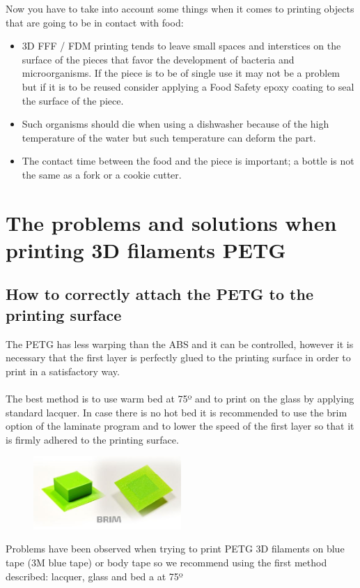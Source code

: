 \documentclass[11pt,a4paper]{article}
\begin{document}
Now you have to take into account some things when it comes to printing objects that are going to be in contact with food:
\begin{itemize}
	\item 3D FFF / FDM printing tends to leave small spaces and interstices on the surface of the pieces that favor the development of bacteria and microorganisms. If the piece is to be of single use it may not be a problem but if it is to be reused consider applying a Food Safety epoxy coating to seal the surface of the piece.
	\item Such organisms should die when using a dishwasher because of the high temperature of the water but such temperature can deform the part.
	\item The contact time between the food and the piece is important; a bottle is not the same as a fork or a cookie cutter.
\end{itemize}
\section{The problems and solutions when printing 3D filaments PETG}
	\subsection{How to correctly attach the PETG to the printing surface}The PETG has less warping than the ABS and it can be controlled, however it is necessary that the first layer is perfectly glued to the printing surface in order to print in a satisfactory way.
\\\\
The best method is to use warm bed at 75º and to print on the glass by applying standard lacquer. In case there is no hot bed it is recommended to use the brim option of the laminate program and to lower the speed of the first layer so that it is firmly adhered to the printing surface.
\begin{figure}[H]
\centering
\includegraphics[width=0.5\textwidth,cfbox=azul_marcos 1pt 0pt]{FOTOS/BRIM}
\end{figure}
Problems have been observed when trying to print PETG 3D filaments on blue tape (3M blue tape) or body tape so we recommend using the first method described: lacquer, glass and bed a at 75º
\end{document}
